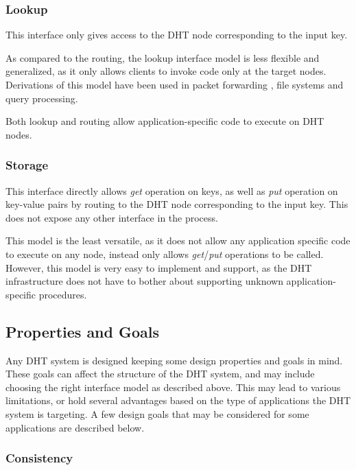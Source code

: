 \documentclass[11pt,a4paper]{article}
\begin{document}
    \subsubsection{Lookup} This interface only gives access to the DHT node corresponding to the input key.
    
    As compared to the routing, the lookup interface model is less flexible and generalized, as it only allows clients to invoke code only at the target nodes. Derivations of this model have been used in packet forwarding \cite{IIIStoica}, file systems \cite{IvyMuthitacharoen,CFSDabek} and query processing. \cite{PierHuebsch}
    
    Both lookup and routing allow application-specific code to execute on DHT nodes.
    
    \subsubsection{Storage} This interface directly allows \textit{get} operation on keys, as well as \textit{put} operation on key-value pairs by routing to the DHT node corresponding to the input key. This does not expose any other interface in the process.
    
    This model is the least versatile, as it does not allow any application specific code to execute on any node, instead only allows \textit{get}/\textit{put} operations to be called. However, this model is very easy to implement and support, as the DHT infrastructure does not have to bother about supporting unknown application-specific procedures.
    
    \subsection{Properties and Goals}
    
    Any DHT system is designed keeping some design properties and goals in mind. These goals can affect the structure of the DHT system, and may include choosing the right interface model as described above. This may lead to various limitations, or hold several advantages based on the type of applications the DHT system is targeting. A few design goals that may be considered for some applications are described below. \cite{DHTWehrle}
    
    \subsubsection{Consistency}\label{consistency}
    
\end{document}
